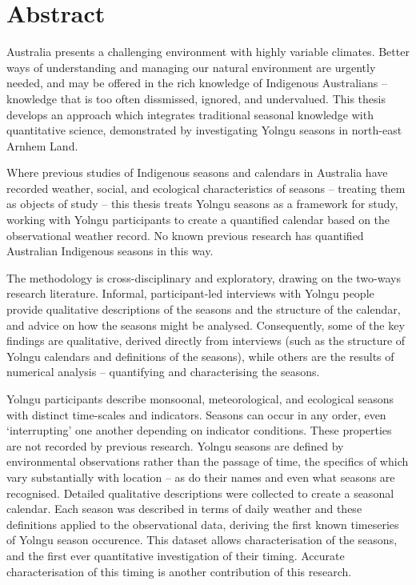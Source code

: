 \chapter{Abstract}

Australia presents a challenging environment with highly variable climates.
Better ways of understanding and managing our natural environment are urgently needed, and
may be offered in the rich knowledge of Indigenous Australians -- knowledge that
is too often dissmissed, ignored, and undervalued.
%
This thesis develops an approach which integrates traditional seasonal knowledge
with quantitative science, demonstrated by investigating Yolngu
seasons in north-east Arnhem Land.

Where previous studies of Indigenous seasons and calendars in Australia have
recorded weather, social, and ecological characteristics of seasons -- treating
them as objects of study -- this thesis treats Yolngu seasons as a framework
for study, working with Yolngu participants to create a quantified calendar
based on the observational weather record.  No known previous research has quantified
Australian Indigenous seasons in this way.


The methodology is cross-disciplinary and exploratory, drawing on the two-ways
research literature.  Informal, participant-led interviews with Yolngu people
provide qualitative descriptions of the seasons and the structure of the
calendar, and advice on how the seasons might be analysed.
%
Consequently, some of the key findings are qualitative, derived directly from
interviews (such as the structure of Yolngu calendars and definitions of the
seasons), while others are the results of numerical analysis -- quantifying
and characterising the seasons.


Yolngu participants describe monsoonal, meteorological, and ecological
seasons with distinct time-scales and indicators.  Seasons can occur in any
order, even `interrupting' one another depending on indicator conditions.
These properties are not recorded by previous research.
%
Yolngu seasons are defined by environmental observations rather than the
passage of time, the specifics of which vary substantially with location --
as do their names and even what seasons are recognised.  Detailed qualitative
descriptions were collected to create a seasonal calendar.
%
Each season was described in terms of daily weather and these definitions
applied to the observational data, deriving the first known timeseries of Yolngu
season occurence.  This dataset allows characterisation of the seasons,
and the first ever quantitative investigation of their timing.  Accurate
characterisation of this timing is another contribution of this research.

